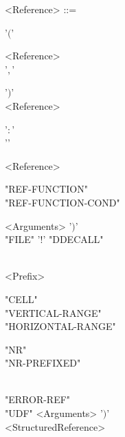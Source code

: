 \begin{grammar}
		<Reference> ::= \begin{syntdiag}[\footnotesize\sdlengths]
		\begin{stack} '$($' \begin{rep} <Reference> \\  '$,$' \end{rep} '$)$' \\
		<Reference> \begin{stack} '$:$' \\ '' \end{stack} <Reference> \\
		\begin{stack} "REF-FUNCTION" \\ "REF-FUNCTION-COND" \end{stack} <Arguments> '$)$' \\
		"FILE" '$!$' "DDECALL" \\
		\begin{stack} \\
		<Prefix>
		\end{stack}
		\begin{stack}
			"CELL" \\
			"VERTICAL-RANGE" \\
			"HORIZONTAL-RANGE" \\
			\begin{stack} "NR" \\ "NR-PREFIXED" \end{stack} \\
			"ERROR-REF" \\
			"UDF" <Arguments> '$)$' \\
			<StructuredReference>
		\end{stack}
		\end{stack}
		\end{syntdiag}
	\end{grammar}